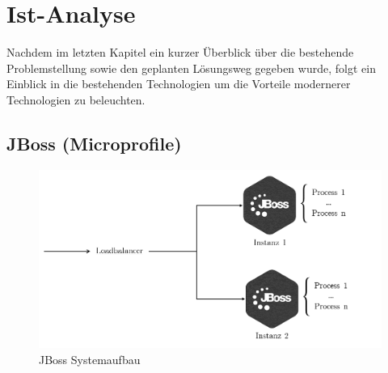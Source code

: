 \chapter{Ist-Analyse}

Nachdem im letzten Kapitel ein kurzer Überblick über die bestehende Problemstellung sowie den geplanten Lösungsweg gegeben wurde, folgt ein Einblick in die bestehenden Technologien um die Vorteile modernerer Technologien zu beleuchten. 

\section{JBoss (Microprofile)}



\begin{figure}[b!]
	\centering
	\includegraphics[width=.7\linewidth]{kapitel/ist-analyse/_img/jbossOverview}
	\caption[JBoss Systemaufbau]{JBoss Systemaufbau}
	\label{fig:jbossArch}
\end{figure}

